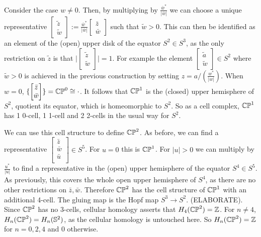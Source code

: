 Consider the case $w\neq 0$. Then, by multiplying by $\frac{\bar{w}^*}{|\bar{w}|}$ we can choose a unique representative $\begin{bmatrix} \tilde{z}\\ \tilde{w} \end{bmatrix}:= \frac{\bar{w}^*}{|\bar{w}|}\begin{bmatrix}\bar{z}\\ \bar{w} \end{bmatrix}$ such that $\tilde{w}> 0$. This can then be identified as an element of the (open) upper disk of the equator $S^2\in S^3$, as the only restriction on $\tilde{z}$ is that $\big|\begin{bmatrix}\tilde{z}\\ \tilde{w} \end{bmatrix} \big|=1$. For example the element $\begin{bmatrix}\tilde{a} \\ \tilde{w}\end{bmatrix} \in S^2$ where $\tilde{w}>0$ is achieved in the previous construction by setting $z=a/(\frac{w^*}{|w|})$. When $w=0$, $\{\begin{bmatrix} \bar{z}\\ \bar{w} \end{bmatrix}\}=\mathbb{CP}^{0}\cong \cdot$. It follows that $\mathbb{CP}^{1}$ is the (closed) upper hemisphere of $S^2$, quotient its equator, which is homeomorphic to $S^2$. So as a cell complex, $\mathbb{CP}^{1}$ has 1 0-cell, 1 1-cell and 2 2-cells in the usual way for $S^2$.

We can use this cell structure to define $\mathbb{CP}^{2}$. As before, we can find a representative $\begin{bmatrix}\bar{z}\\ \bar{w}\\ \bar{u}\\ \end{bmatrix}\in S^5$. For $u=0$ this is $\mathbb{CP}^{1}$. For $|u|>0$ we can multiply by $\frac{u^*}{|u|}$ to find a representative in the (open) upper hemisphere of the equator $S^4\in S^5$. As previously, this covers the whole open upper hemisphere of $S^4$, as there are no other restrictions on $\bar{z},\bar{w}$. Therefore $\mathbb{CP}^{2}$ has the cell structure of $\mathbb{CP}^{1}$ with an additional 4-cell. The gluing map is the Hopf map $S^3\rightarrow S^2$. (ELABORATE). Since $\mathbb{CP}^{2}$ has no 3-cells, cellular homology asserts that $H_4(\mathbb{CP}^{2})=\mathbb{Z}$. For $n\neq 4$, $H_n(\mathbb{CP}^{2})=H_n(\mathbb{S}^{2})$, as the cellular homology is untouched here. So $H_n(\mathbb{CP}^{2})=\mathbb{Z}$ for $n=0,2,4$ and $0$ otherwise.

